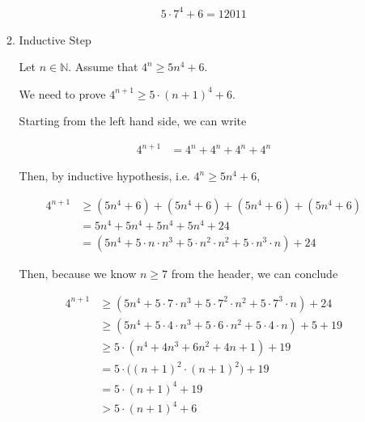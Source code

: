 \documentclass[12pt]{article}
\begin{document}
\begin{itemize}
\begin{mdframed}
\begin{enumerate}[1.]
\begin{mdframed}
            \begin{align}
                5 \cdot 7^4 + 6 = 12011
            \end{align}

            \end{mdframed}

            \item Inductive Step

            \begin{mdframed}

            Let $n \in \mathbb{N}$. Assume that $4^n \geq 5n^4 + 6$.

            \bigskip

            We need to prove $4^{n+1} \geq 5 \cdot (n+1)^4 + 6$.

            \bigskip

            Starting from the left hand side, we can write

            \begin{align}
            4^{n+1} &= 4^n + 4^n + 4^n + 4^n
            \end{align}

            \bigskip

            Then, by inductive hypothesis, i.e. $4^n \geq 5n^4 + 6$,

            \begin{align}
            4^{n+1} &\geq (5n^4 + 6) + (5n^4 + 6) + (5n^4 + 6) + (5n^4 + 6)\\
            &= 5n^4 + 5n^4 + 5n^4 + 5n^4 + 24\\
            &= (5n^4 + 5 \cdot n \cdot n^3 + 5 \cdot n^2 \cdot n^2 + 5 \cdot n^3 \cdot n) + 24
            \end{align}

            \bigskip

            Then, because we know $n \geq 7$ from the header, we can conclude

            \begin{align}
            4^{n+1} &\geq (5n^4 + 5 \cdot 7 \cdot n^3 + 5 \cdot 7^2 \cdot n^2 + 5 \cdot 7^3 \cdot n) + 24\\
            &\geq (5n^4 + 5 \cdot 4 \cdot n^3 + 5 \cdot 6 \cdot n^2 + 5 \cdot 4 \cdot n) + 5 + 19\\
            &\geq 5 \cdot (n^4 + 4n^3 + 6n^2 + 4n + 1) + 19\\
            &= 5 \cdot \bigl((n+1)^2 \cdot (n+1)^2 \bigr) + 19\\
            &= 5 \cdot (n+1)^4 + 19\\
            &> 5 \cdot (n+1)^4 + 6
            \end{align}

            \end{mdframed}
        \end{enumerate}
    \end{mdframed}
\end{itemize}
\end{document}
